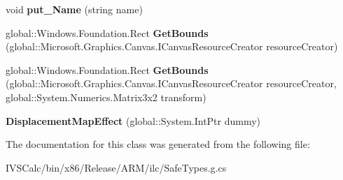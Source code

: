 \begin{DoxyCompactItemize}
\mbox{\label{class_microsoft_1_1_graphics_1_1_canvas_1_1_effects_1_1_displacement_map_effect_ab487b040a6866d4895664025280310b5}} 
void {\bfseries put\+\_\+\+Name} (string name)
\item 
\mbox{\label{class_microsoft_1_1_graphics_1_1_canvas_1_1_effects_1_1_displacement_map_effect_a2e6badea68c005f4b53a34c1bc09a0cd}} 
global\+::\+Windows.\+Foundation.\+Rect {\bfseries Get\+Bounds} (global\+::\+Microsoft.\+Graphics.\+Canvas.\+I\+Canvas\+Resource\+Creator resource\+Creator)
\item 
\mbox{\label{class_microsoft_1_1_graphics_1_1_canvas_1_1_effects_1_1_displacement_map_effect_ae496e3721b3056df38f4cf85aac6cabe}} 
global\+::\+Windows.\+Foundation.\+Rect {\bfseries Get\+Bounds} (global\+::\+Microsoft.\+Graphics.\+Canvas.\+I\+Canvas\+Resource\+Creator resource\+Creator, global\+::\+System.\+Numerics.\+Matrix3x2 transform)
\item 
\mbox{\label{class_microsoft_1_1_graphics_1_1_canvas_1_1_effects_1_1_displacement_map_effect_ae0d7553bd7b893a6a8c39c315ffc0105}} 
{\bfseries Displacement\+Map\+Effect} (global\+::\+System.\+Int\+Ptr dummy)
\end{DoxyCompactItemize}


The documentation for this class was generated from the following file\+:\begin{DoxyCompactItemize}
\item 
I\+V\+S\+Calc/bin/x86/\+Release/\+A\+R\+M/ilc/Safe\+Types.\+g.\+cs\end{DoxyCompactItemize}
